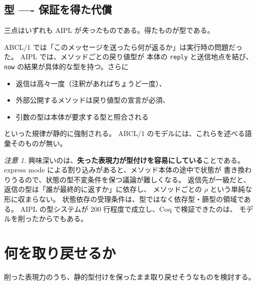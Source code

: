 \documentclass[11pt,a4paper]{ltjsarticle}
\theoremstyle{remark}
\newtheorem{remark}{注意}
\begin{document}
\subsection{型 ---- 保証を得た代償}

三点はいずれも AIPL が\emph{失った}ものである。得たものが型である。

ABCL/1 では「このメッセージを送ったら何が返るか」は実行時の問題だった。
AIPL では、メソッドごとの戻り値型が
本体の \texttt{reply} と送信地点を結び、
\texttt{now} の結果が具体的な型を持つ。さらに

\begin{itemize}
\item 返信は高々一度（注釈があればちょうど一度）、
\item 外部公開するメソッドは戻り値型の宣言が必須、
\item 引数の型は本体が要求する型と照合される
\end{itemize}

といった規律が静的に強制される。
ABCL/1 のモデルには、これらを述べる語彙そのものが無い。

\begin{remark}
興味深いのは、\textbf{失った表現力が型付けを容易にしている}ことである。
express mode による割り込みがあると、メソッド本体の途中で状態が
書き換わりうるので、状態の型不変条件を保つ議論が難しくなる。
返信先が一級だと、返信の型は「誰が最終的に返すか」に依存し、
メソッドごとの $\rho$ という単純な形に収まらない。
状態依存の受理条件は、型ではなく依存型・篩型の領域である。
AIPL の型システムが 200 行程度で成立し、Coq で検証できたのは、
モデルを削ったからでもある。
\end{remark}

\section{何を取り戻せるか}

削った表現力のうち、静的型付けを保ったまま取り戻せそうなものを検討する。
\end{document}
